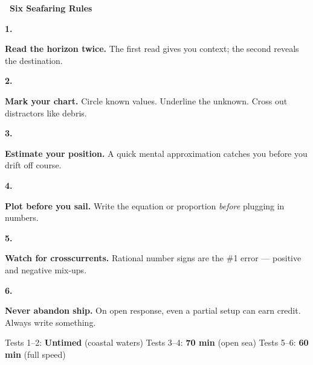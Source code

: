 {%
\noindent\textcolor{navDeep}{\large\bfseries\faAnchor~Six Seafaring Rules}

\vspace{2mm}

\newcommand{\seaRule}[3]{%
    \noindent
    \begin{minipage}[t]{0.06\linewidth}
        \centering
        \textcolor{#2}{\fontsize{16}{16}\selectfont\bfseries #1.}
    \end{minipage}%
    \begin{minipage}[t]{0.92\linewidth}
        \small #3
    \end{minipage}
    \vspace{2mm}
}

\seaRule{1}{navTeal}{%
    \textbf{Read the horizon twice.} The first read gives you context; the second reveals the destination.
}
\seaRule{2}{navGold!80!black}{%
    \textbf{Mark your chart.} Circle known values. Underline the unknown. Cross out distractors like debris.
}
\seaRule{3}{navDeep}{%
    \textbf{Estimate your position.} A quick mental approximation catches you before you drift off course.
}
\seaRule{4}{navTeal}{%
    \textbf{Plot before you sail.} Write the equation or proportion \textit{before} plugging in numbers.
}
\seaRule{5}{navGold!80!black}{%
    \textbf{Watch for crosscurrents.} Rational number signs are the \#1 error --- positive and negative mix-ups.
}
\seaRule{6}{navDeep}{%
    \textbf{Never abandon ship.} On open response, even a partial setup can earn credit. Always write something.
}

\vspace{2mm}

\begin{tcolorbox}[
    enhanced,
    colback=navGoldLight,
    colframe=navGold!40,
    arc=4pt, boxrule=0.8pt,
    left=5mm, right=5mm, top=3mm, bottom=3mm,
    title={\small\textcolor{white}{\faClock~Voyage Clock}},
    colbacktitle=navGold!65,
    fonttitle=\bfseries\sffamily,
    borderline west={3pt}{0pt}{navGold!50},
]
    \small\centering
    Tests 1--2: \textbf{Untimed} (coastal waters)
    \quad\textcolor{navGold!50}{\faAngleRight}\quad
    Tests 3--4: \textbf{70 min} (open sea)
    \quad\textcolor{navGold!50}{\faAngleRight}\quad
    Tests 5--6: \textbf{60 min} (full speed)
\end{tcolorbox}

\vspace{2mm}

}
